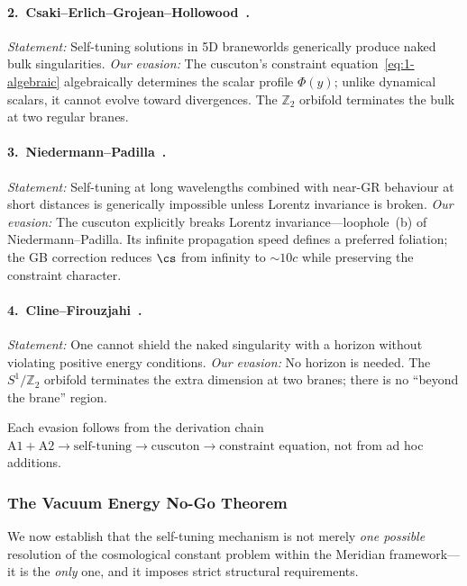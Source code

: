 \paragraph{2.\ Csaki--Erlich--Grojean--Hollowood~\cite{ch1:csaki00}.}
\emph{Statement:} Self-tuning solutions in 5D braneworlds generically produce naked bulk singularities. \emph{Our evasion:} The cuscuton's constraint equation~\eqref{eq:1-algebraic} algebraically determines the scalar profile $\Phi(y)$; unlike dynamical scalars, it cannot evolve toward divergences. The $\mathbb{Z}_2$ orbifold terminates the bulk at two regular branes.

\paragraph{3.\ Niedermann--Padilla~\cite{ch1:niedermann-padilla}.}
\emph{Statement:} Self-tuning at long wavelengths combined with near-GR behaviour at short distances is generically impossible unless Lorentz invariance is broken. \emph{Our evasion:} The cuscuton explicitly breaks Lorentz invariance---loophole~(b) of Niedermann--Padilla. Its infinite propagation speed defines a preferred foliation; the GB correction reduces $\cs$ from infinity to $\sim 10c$ while preserving the constraint character.

\paragraph{4.\ Cline--Firouzjahi~\cite{ch1:cline-firouzjahi}.}
\emph{Statement:} One cannot shield the naked singularity with a horizon without violating positive energy conditions. \emph{Our evasion:} No horizon is needed. The $S^1/\mathbb{Z}_2$ orbifold terminates the extra dimension at two branes; there is no ``beyond the brane'' region.

\medskip

Each evasion follows from the derivation chain $\mathrm{A1} + \mathrm{A2} \to \text{self-tuning} \to \text{cuscuton} \to \text{constraint equation}$, not from ad hoc additions.

\subsubsection{The Vacuum Energy No-Go Theorem}
\label{sec:1-nogo-formal}

We now establish that the self-tuning mechanism is not merely \emph{one possible} resolution of the cosmological constant problem within the Meridian framework---it is the \emph{only} one, and it imposes strict structural requirements.

